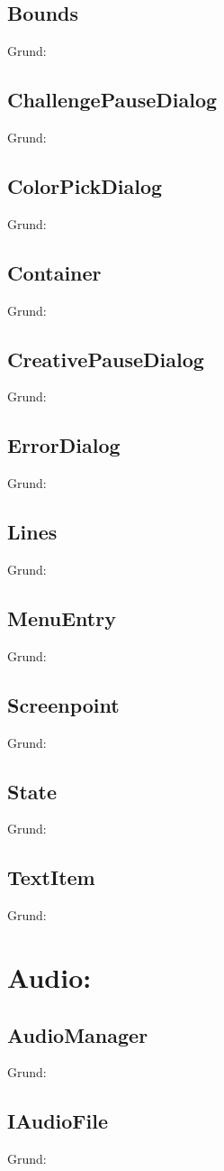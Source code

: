 \subsection{Bounds}
Grund:
\subsection{ChallengePauseDialog}
Grund:
\subsection{ColorPickDialog}
Grund:
\subsection{Container}
Grund:
\subsection{CreativePauseDialog}
Grund:
\subsection{ErrorDialog}
Grund:
\subsection{Lines}
Grund:
\subsection{MenuEntry}
Grund:
\subsection{Screenpoint}
Grund:
\subsection{State}
Grund:
\subsection{TextItem}
Grund:

\section{Audio:}
\subsection{AudioManager}
Grund:
\subsection{IAudioFile}
Grund:
